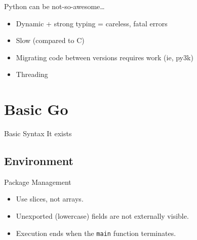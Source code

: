 \documentclass{beamer}
\begin{document}
\begin{frame}{Python can be not-so-awesome\dots}
    \begin{itemize}
        \item
            Dynamic + strong typing = careless, fatal errors
        \item
            Slow (compared to C)
        \item
            Migrating code between versions requires work (ie, py3k)
        \item
            Threading
    \end{itemize}
\end{frame}

\section{Basic Go}

\begin{frame}{Basic Syntax}
    It exists
\end{frame}
\subsection{Environment}

\begin{frame}{Package Management}
    \begin{itemize}
        \item
            Use slices, not arrays.
        \item
            Unexported (lowercase) fields are not externally visible.
        \item
            Execution ends when the \texttt{main} function terminates.
    \end{itemize}

\end{frame}
\end{document}
